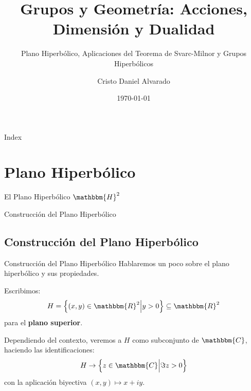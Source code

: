 \documentclass[xcolor=dvipsnames]{beamer}
\title{Grupos y Geometría: Acciones, Dimensión y Dualidad}
\subtitle{Plano Hiperbólico, Aplicaciones del Teorema de Svarc-Milnor y Grupos Hiperbólicos}
\author{Cristo Daniel Alvarado}
\institute
{
    Escuela Superior de Física y Matemáticas \\
    Instituto Politécnico Nacional
}
\date{\today} %
\theoremstyle{largebreak}
\newcommand{\bbm}[1]{\ensuremath{\mathbbm{#1}}}
\begin{document}
\begin{frame}
    \titlepage
\end{frame}

\begin{frame}{Index}
    \tableofcontents
\end{frame}

\section{Plano Hiperbólico}

\begin{frame}
    \begin{center}
        \LARGE{El Plano Hiperbólico $\bbm{H}^2$}
    \end{center}
\end{frame}

\begin{frame}
    \begin{center}
        Construcción del Plano Hiperbólico
    \end{center}
\end{frame}

\subsection{Construcción del Plano Hiperbólico}

\begin{frame}{Construcción del Plano Hiperbólico}
    Hablaremos un poco sobre el plano hiperbólico y sus propiedades.
    \begin{mydef}
        Escribimos:
        \begin{equation*}
            H=\left\{(x,y)\in\bbm{R}^2\Big|y>0 \right\}\subseteq\bbm{R}^2
        \end{equation*}
        para el \textbf{plano superior}.
    \end{mydef}
    \begin{obs}
        Dependiendo del contexto, veremos a $H$ como subconjunto de $\bbm{C}$, haciendo las identificaciones:
        \begin{equation*}
            H\rightarrow\left\{z\in\bbm{C}\Big|\Im z>0 \right\}
        \end{equation*}
        con la aplicación biyectiva $(x,y)\mapsto x+iy$.
    \end{obs}
\end{frame}
\end{document}

